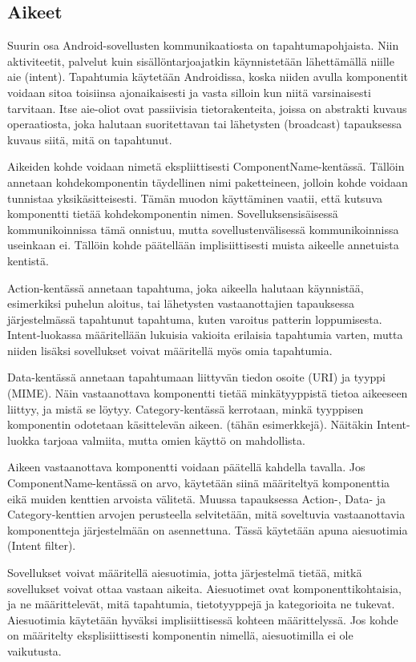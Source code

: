 \subsection{Aikeet}
\label{intents}

Suurin osa Android-sovellusten kommunikaatiosta on tapahtumapohjaista. Niin aktiviteetit, palvelut kuin sisällöntarjoajatkin käynnistetään lähettämällä niille aie (intent). Tapahtumia käytetään Androidissa, koska niiden avulla komponentit voidaan sitoa toisiinsa ajonaikaisesti ja vasta silloin kun niitä varsinaisesti tarvitaan. Itse aie-oliot ovat passiivisia tietorakenteita, joissa on abstrakti kuvaus operaatiosta, joka halutaan suoritettavan tai lähetysten (broadcast) tapauksessa kuvaus siitä, mitä on tapahtunut. 

Aikeiden kohde voidaan nimetä ekspliittisesti ComponentName-kentässä. Tällöin annetaan kohdekomponentin täydellinen nimi paketteineen, jolloin kohde voidaan tunnistaa yksikäsitteisesti. Tämän muodon käyttäminen vaatii, että kutsuva komponentti tietää kohdekomponentin nimen. Sovelluksensisäisessä kommunikoinnissa tämä onnistuu, mutta sovellustenvälisessä kommunikoinnissa useinkaan ei. Tällöin kohde päätellään implisiittisesti muista aikeelle annetuista kentistä.

Action-kentässä annetaan tapahtuma, joka aikeella halutaan käynnistää, esimerkiksi puhelun aloitus, tai lähetysten vastaanottajien tapauksessa järjestelmässä tapahtunut tapahtuma, kuten varoitus patterin loppumisesta. Intent-luokassa määritellään lukuisia vakioita erilaisia tapahtumia varten, mutta niiden lisäksi sovellukset voivat määritellä myös omia tapahtumia.

Data-kentässä annetaan tapahtumaan liittyvän tiedon osoite (URI) ja tyyppi (MIME). Näin vastaanottava komponentti tietää minkätyyppistä tietoa aikeeseen liittyy, ja mistä se löytyy. Category-kentässä kerrotaan, minkä tyyppisen komponentin odotetaan käsittelevän aikeen. (tähän esimerkkejä). Näitäkin Intent-luokka tarjoaa valmiita, mutta omien käyttö on mahdollista.

Aikeen vastaanottava komponentti voidaan päätellä kahdella tavalla. Jos ComponentName-kentässä on arvo, käytetään siinä määriteltyä komponenttia eikä muiden kenttien arvoista välitetä. Muussa tapauksessa Action-, Data- ja Category-kenttien arvojen perusteella selvitetään, mitä soveltuvia vastaanottavia komponentteja järjestelmään on asennettuna. Tässä käytetään apuna aiesuotimia (Intent filter).

Sovellukset voivat määritellä aiesuotimia, jotta järjestelmä tietää, mitkä sovellukset voivat ottaa vastaan aikeita. Aiesuotimet ovat komponenttikohtaisia, ja ne määrittelevät, mitä tapahtumia, tietotyyppejä ja kategorioita ne tukevat. Aiesuotimia käytetään hyväksi implisiittisessä kohteen määrittelyssä. Jos kohde on määritelty eksplisiittisesti komponentin nimellä, aiesuotimilla ei ole vaikutusta. \cite{android}

